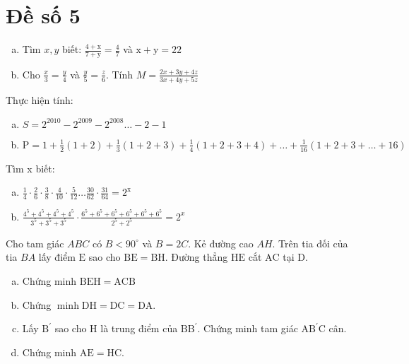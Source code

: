 \onehalfspacing
\section{Đề số 5}

\begin{bt} 
	\hfill
	\begin{enumerate}[a.]
		\item Tìm $x, y$ biết: $\frac{4+\mathrm{x}}{7+\mathrm{y}}=\frac{4}{7}$ và $\mathrm{x}+\mathrm{y}=22$
		\item Cho $\frac{x}{3}=\frac{y}{4}$ và $\frac{y}{5}=\frac{z}{6}$. Tính $M=\frac{2 x+3 y+4 z}{3 x+4 y+5 z}$
	\end{enumerate}
	\loigiai{} 
\end{bt}

\begin{bt}
	Thực hiện tính:
	\begin{enumerate}[a.]
		\item $S=2^{2010}-2^{2009}-2^{2008} \ldots-2-1$
		\item $\mathrm{P}=1+\frac{1}{2}(1+2)+\frac{1}{3}(1+2+3)+\frac{1}{4}(1+2+3+4)+\ldots+\frac{1}{16}(1+2+3+\ldots+16)$
	\end{enumerate}
	\loigiai{} 
\end{bt}

\begin{bt}
	Tìm x biết:
	\begin{enumerate}[a.]
		\item 
		 $\frac{1}{4} \cdot \frac{2}{6} \cdot \frac{3}{8} \cdot \frac{4}{10} \cdot \frac{5}{12} \ldots \frac{30}{62} \cdot \frac{31}{64}=2^{\mathrm{x}}$
		\item $\frac{4^5+4^5+4^5+4^5}{3^5+3^5+3^5} \cdot \frac{6^5+6^5+6^5+6^5+6^5+6^5}{2^5+2^5}=2^x$
	\end{enumerate}
	\loigiai{} 
\end{bt}

\begin{bt}
	Cho tam giác $A B C$ có $B<90^{\circ}$ và $B=2 C$. Kẻ đường cao $A H$. Trên tia đối của tia $B A$ lấy điểm $\mathrm{E}$ sao cho $\mathrm{BE}=\mathrm{BH}$. Đường thẳng $\mathrm{HE}$ cắt $\mathrm{AC}$ tại $\mathrm{D}$. 
	\begin{enumerate}[a.]
		\item Chứng minh $\mathrm{BEH}=\mathrm{ACB}$
		\item Chứng $\operatorname{minh} \mathrm{DH}=\mathrm{DC}=\mathrm{DA}$.
		\item Lấy $\mathrm{B}^{\prime}$ sao cho $\mathrm{H}$ là trung điểm của $\mathrm{BB}^{\prime}$. Chứng minh tam giác $\mathrm{AB}^{\prime} \mathrm{C}$ cân.
		\item Chứng minh $\mathrm{AE}=\mathrm{HC}$.
	\end{enumerate}
	\loigiai{}
\end{bt}